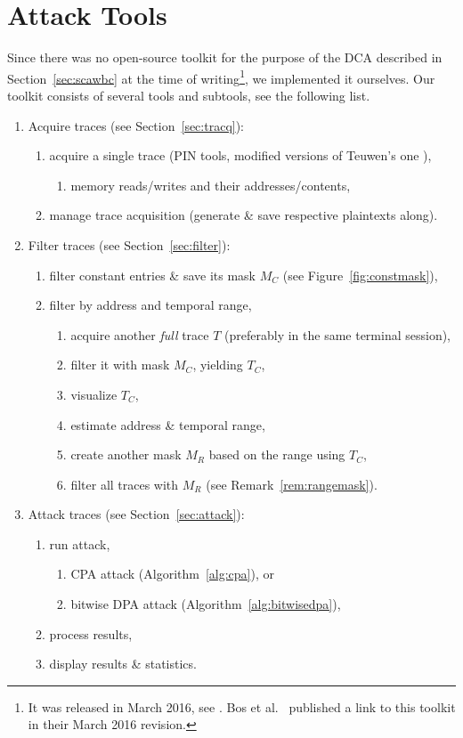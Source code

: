 \section{Attack Tools}
\label{sec:tools}

Since there was no open-source toolkit for the purpose of the DCA described in Section~\ref{sec:scawbc} at the time of writing\footnote{It was released in March 2016, see \cite{bos2016tools}. Bos et al.\ \cite{bos2015differential} published a link to this toolkit in their March 2016 revision.}, we implemented it ourselves. Our toolkit consists of several tools and subtools, see the following list.

\begin{enumerate}
	\item Acquire traces (see Section~\ref{sec:tracq}):
	\begin{enumerate}
		\item acquire a single trace (PIN tools, modified versions of Teuwen's one \cite{teuwen2015movfuscator}),
		\begin{enumerate}
			\item memory reads/writes and their addresses/contents,
		\end{enumerate}
		\item manage trace acquisition (generate \& save respective plaintexts along).
	\end{enumerate}
	\item Filter traces (see Section~\ref{sec:filter}):
	\begin{enumerate}
		\item filter constant entries \& save its mask $M_C$ (see Figure~\ref{fig:constmask}),
		\item filter by address and temporal range,
		\begin{enumerate}
			\item acquire another {\em full} trace $T$ (preferably in the same terminal session),
			\item filter it with mask $M_C$, yielding $T_C$,
			\item visualize $T_C$,
			\item estimate address \& temporal range,
			\item create another mask $M_R$ based on the range using $T_C$,
			\item filter all traces with $M_R$ (see Remark~\ref{rem:rangemask}).
		\end{enumerate}
	\end{enumerate}
	\item Attack traces (see Section~\ref{sec:attack}):
	\begin{enumerate}
		\item run attack,
		\begin{enumerate}
			\item CPA attack (Algorithm~\ref{alg:cpa}), or
			\item bitwise DPA attack (Algorithm~\ref{alg:bitwisedpa}),
		\end{enumerate}
		\item process results,
		\item display results \& statistics.
	\end{enumerate}
\end{enumerate}
